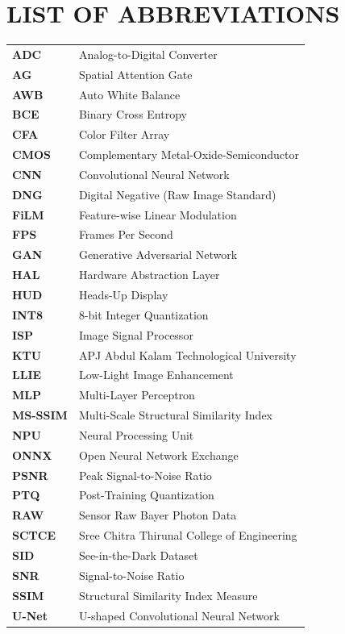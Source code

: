 \chapter*{LIST OF ABBREVIATIONS}

\vspace{0.6cm}

\noindent
\begin{longtable}{p{3.5cm}p{10.5cm}}
\textbf{ADC} & Analog-to-Digital Converter \\[0.6cm]
\textbf{AG} & Spatial Attention Gate \\[0.6cm]
\textbf{AWB} & Auto White Balance \\[0.6cm]
\textbf{BCE} & Binary Cross Entropy \\[0.6cm]
\textbf{CFA} & Color Filter Array \\[0.6cm]
\textbf{CMOS} & Complementary Metal-Oxide-Semiconductor \\[0.6cm]
\textbf{CNN} & Convolutional Neural Network \\[0.6cm]
\textbf{DNG} & Digital Negative (Raw Image Standard) \\[0.6cm]
\textbf{FiLM} & Feature-wise Linear Modulation \\[0.6cm]
\textbf{FPS} & Frames Per Second \\[0.6cm]
\textbf{GAN} & Generative Adversarial Network \\[0.6cm]
\textbf{HAL} & Hardware Abstraction Layer \\[0.6cm]
\textbf{HUD} & Heads-Up Display \\[0.6cm]
\textbf{INT8} & 8-bit Integer Quantization \\[0.6cm]
\textbf{ISP} & Image Signal Processor \\[0.6cm]
\textbf{KTU} & APJ Abdul Kalam Technological University \\[0.6cm]
\textbf{LLIE} & Low-Light Image Enhancement \\[0.6cm]
\textbf{MLP} & Multi-Layer Perceptron \\[0.6cm]
\textbf{MS-SSIM} & Multi-Scale Structural Similarity Index \\[0.6cm]
\textbf{NPU} & Neural Processing Unit \\[0.6cm]
\textbf{ONNX} & Open Neural Network Exchange \\[0.6cm]
\textbf{PSNR} & Peak Signal-to-Noise Ratio \\[0.6cm]
\textbf{PTQ} & Post-Training Quantization \\[0.6cm]
\textbf{RAW} & Sensor Raw Bayer Photon Data \\[0.6cm]
\textbf{SCTCE} & Sree Chitra Thirunal College of Engineering \\[0.6cm]
\textbf{SID} & See-in-the-Dark Dataset \\[0.6cm]
\textbf{SNR} & Signal-to-Noise Ratio \\[0.6cm]
\textbf{SSIM} & Structural Similarity Index Measure \\[0.6cm]
\textbf{U-Net} & U-shaped Convolutional Neural Network \\
\end{longtable}

